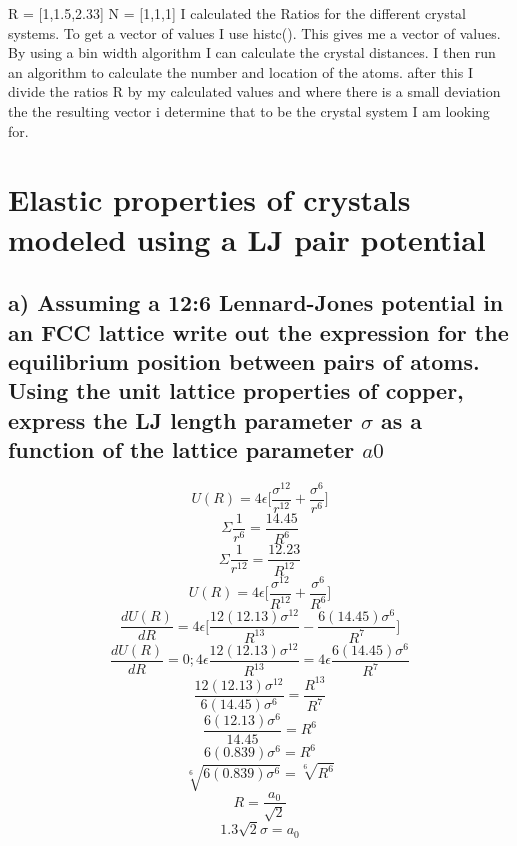 \documentclass[paper=a4, fontsize=12pt]{scrartcl} %
\numberwithin{equation}{section} %
\numberwithin{figure}{section} %
\numberwithin{table}{section} %
\begin{document}
R = [1,1.5,2.33]
N = [1,1,1]
I calculated the Ratios for the different crystal systems. To get a vector of values I use histc(). This gives me a vector of values. By using a bin width algorithm I can calculate the crystal distances. I then run an algorithm to calculate the number and location of the atoms. after this I divide the ratios R by my calculated values and where there is a small deviation the the resulting vector i determine that to be the crystal system I am looking for. 


\section{\small{ Elastic properties of crystals modeled using a LJ pair potential}}
\subsection*{\small{a) Assuming a 12:6 Lennard-Jones potential in an FCC lattice 
write out the expression for the equilibrium position between pairs of atoms.
Using the unit lattice properties of copper, express the LJ length parameter \(\sigma\) as a
function of the lattice parameter \(a0\)}}
\[U(R) = 4\epsilon \Big[\frac{\sigma^{12}}{r^{12}}+ \frac{\sigma^{6}}{r^{6}} \Big]\]
\[\Sigma \frac{1}{r^6} = \frac{14.45}{R^6}\]
\[\Sigma \frac{1}{r^{12}} = \frac{12.23}{R^{12}}\]
\[U(R) = 4\epsilon \Big[\frac{\sigma^{12}}{R^{12}}+ \frac{\sigma^{6}}{R^{6}} \Big]\]
\[\frac{d U(R)}{dR} = 4\epsilon \Big[\frac{12(12.13)\sigma^{12}}{R^{13}} - \frac{6(14.45)\sigma^6}{R^7} \Big]  \] 
\[\frac{d U(R)}{dR} = 0; 4\epsilon \frac{12(12.13)\sigma^{12}}{R^{13}} = 4\epsilon \frac{6(14.45)\sigma^6}{R^7}\]
\[\frac{12(12.13)\sigma^{12}}{6(14.45)\sigma^6} = \frac{R^{13}}{R^7}\]
\[\frac{6(12.13)\sigma^6}{14.45} = R^6\]
\[6(0.839)\sigma^6 = R^6\]
\[\sqrt[6]{6(0.839)\sigma^6} = \sqrt[6]{R^6}\]
\[R = \frac{a_0}{\sqrt{2}}\]
\[1.3\sqrt{2}\sigma = a_0\]

\begin{center}
\end{center} 
\end{document}
